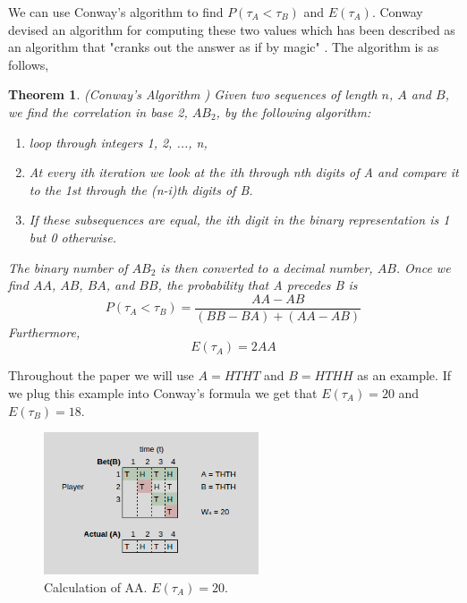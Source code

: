 \documentclass{article}
\newtheorem{theorem}{Theorem}[section]
\numberwithin{mytheorem}{subsection} %
\begin{document}
		We can use Conway's algorithm to find $P(\tau_A < \tau_B)$ and $E(\tau_A)$. Conway devised an algorithm for computing these two values which has been described as an algorithm that "cranks out the answer as if by magic" \cite{gardner}. The algorithm is as follows,

		\begin{theorem}(Conway's Algorithm \cite{gardner})
		Given two sequences of length $n$, $A$ and $B$, we find the correlation in base 2, $AB_2$, by the following algorithm:
		\begin{enumerate}
		\item loop through integers 1, 2, ..., n,
		\item At every ith iteration we look at the ith through nth digits of A and compare
		   it to the 1st through the (n-i)th digits of B.
		\item If these subsequences are equal, the ith digit in the binary representation is 1 but 0 otherwise.
		\end{enumerate} 

		The binary number of $AB_2$
		is then converted to a decimal number, $AB$. Once we find $AA$, $AB$,
		$BA$, and $BB$, the probability that A precedes B is
		$$P(\tau_A < \tau_B) = \frac{AA - AB}{(BB - BA) + (AA - AB)} $$
		Furthermore, 
		$$E(\tau_A) = 2AA $$ 
		\end{theorem}

		Throughout the paper we will use $A = HTHT$ and $B = HTHH$ as an example. If we plug this example into Conway's formula we get that $E(\tau_{A}) = 20$ and $E(\tau_{B}) = 18$.

		\begin{figure}[h]
			\begin{center}
				\includegraphics[width=2.5in]{AA}
			\end{center}
		
			\caption{Calculation of AA. $E(\tau_A) = 20$.}
		\label{fig}
		\end{figure}

\end{document}
